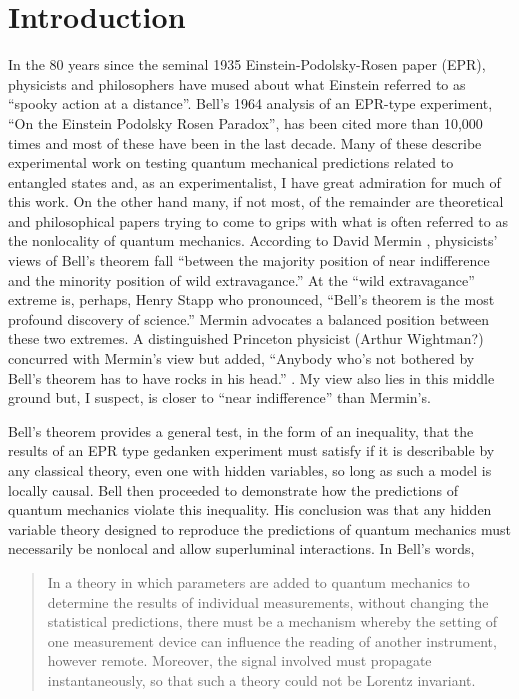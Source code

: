 \documentclass[12pt]{article}
\begin{document}
\section{Introduction}\label{INTRO}

In the 80 years since the seminal 1935 Einstein-Podolsky-Rosen paper (EPR)\cite{EPR35}, physicists and philosophers have mused about what Einstein referred to as ``spooky action at a distance''. Bell's 1964 analysis of an EPR-type experiment, ``On the Einstein Podolsky Rosen Paradox''\cite{Bel64}, has been cited more than 10,000 times and most of these have been in the last decade. Many of these describe experimental work on testing quantum mechanical predictions related to entangled states and, as an experimentalist, I have great admiration for much of this work. On the other hand many, if not most, of the remainder are theoretical and philosophical papers trying to come to grips with what is often referred to as the nonlocality of quantum mechanics. According to David Mermin \cite{Mer85}, physicists' views of Bell's theorem fall ``between the majority position of near indifference and the minority position of wild extravagance.'' At the ``wild extravagance'' extreme is, perhaps, Henry Stapp  who pronounced, ``Bell's theorem is the most profound discovery of science.''\cite{Sta75}  Mermin advocates a balanced position between these two extremes. A distinguished Princeton physicist (Arthur Wightman?) concurred with Mermin's view but added, ``Anybody who's not bothered by Bell's theorem has to have rocks in his head.'' \cite{Mer85}. My view also lies in this middle ground but, I suspect, is closer to ``near indifference'' than Mermin's.

Bell's theorem provides a general test, in the form of an inequality, that the results of an EPR type gedanken experiment must satisfy if it is describable by any classical theory, even one with hidden variables, so long as such a model is locally causal. Bell then proceeded to demonstrate how the predictions of quantum mechanics violate this inequality. His conclusion was that any hidden variable theory designed to reproduce the predictions of quantum mechanics must necessarily be nonlocal and allow superluminal interactions. In Bell's words\cite{Bel64},
\begin{quote}
In a theory in which parameters are added to quantum mechanics to determine the results of individual measurements, without changing the statistical predictions, there must be a mechanism whereby the setting of one measurement device can influence the reading of another instrument, however remote. Moreover, the signal involved must propagate instantaneously, so that such a theory could not be Lorentz invariant.
\end{quote}
\end{document}
